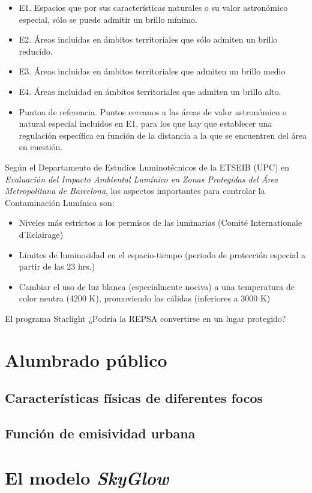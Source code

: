 \begin{itemize}

    \item E1. Espacios que por sus características naturales o su valor astronómico especial, sólo se puede admitir un brillo mínimo.
    
    \item E2. Áreas incluidas en ámbitos territoriales que sólo admiten un brillo reducido.
    
    \item E3. Áreas incluidas en ámbitos territoriales que admiten un brillo medio
    
    \item E4. Áreas incluidad en ámbitos territoriales que admiten un brillo alto.
    
    \item Puntoa de referencia. Puntos cercanos a las áreas de valor astronómico o natural especial incluidos en E1, para los que hay que establecer una regulación específica en función de la distancia a la que se encuentren del área en cuestión.
    
    
\end{itemize}

Según el Departamento de Estudios Luminotécnicos de la ETSEIB (UPC) en \textit{Evaluación del Impacto Ambiental Lumínico en Zonas Protegidas del Área Metropolitana de Barcelona}, los aspectos importantes para controlar la Contaminación Lumínica son:

\begin{itemize}
    \item Niveles más estrictos a los permisos de las luminarias (Comité Internationale d'Eclairage)
    
    \item Límites de luminosidad en el espacio-tiempo (periodo de protección especial a partir de las 23 hrs.)
    
     \item Cambiar el uso de luz blanca (especialmente nociva) a una temperatura de color neutra (4200 K), promoviendo las cálidas (inferiores a 3000 K)
     
\end{itemize}

El programa Starlight ¿Podría la REPSA convertirse en un lugar protegido?   

\section{Alumbrado público}

\subsection{Características físicas de diferentes focos}
\subsection{Función de emisividad urbana}

\section{El modelo \textit{SkyGlow}}